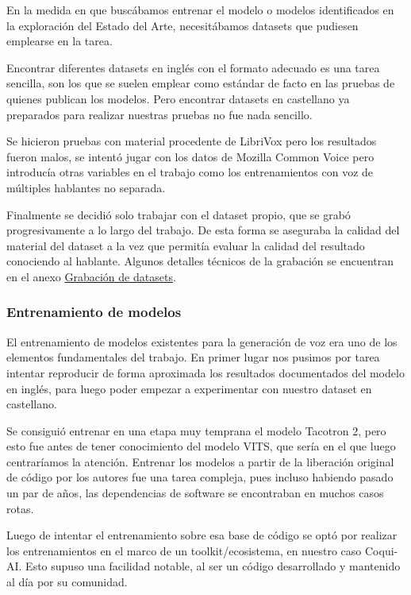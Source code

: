 En la medida en que buscábamos entrenar el modelo o modelos identificados en la exploración del Estado del Arte, necesitábamos datasets que pudiesen emplearse en la tarea.

Encontrar diferentes datasets en inglés con el formato adecuado es una tarea sencilla, son los que se suelen emplear como estándar de facto en las pruebas de quienes publican los modelos. Pero encontrar datasets en castellano ya preparados para realizar nuestras pruebas no fue nada sencillo.

Se hicieron pruebas con material procedente de LibriVox pero los resultados fueron malos, se intentó jugar con los datos de Mozilla Common Voice pero introducía otras variables en el trabajo como los entrenamientos con voz de múltiples hablantes no separada.

Finalmente se decidió solo trabajar con el dataset propio, que se grabó progresivamente a lo largo del trabajo. De esta forma se aseguraba la calidad del material del dataset a la vez que permitía evaluar la calidad del resultado conociendo al hablante. Algunos detalles técnicos de la grabación se encuentran en el anexo \hyperref[Grabación de datasets]{Grabación de datasets}.

\subsubsection{Entrenamiento de modelos}

El entrenamiento de modelos existentes para la generación de voz era uno de los elementos fundamentales del trabajo. En primer lugar nos pusimos por tarea intentar reproducir de forma aproximada los resultados documentados del modelo en inglés, para luego poder empezar a experimentar con nuestro dataset en castellano.

Se consiguió entrenar en una etapa muy temprana el modelo Tacotron 2, pero esto fue antes de tener conocimiento del modelo VITS, que sería en el que luego centraríamos la atención. Entrenar los modelos a partir de la liberación original de código por los autores fue una tarea compleja, pues incluso habiendo pasado un par de años, las dependencias de software se encontraban en muchos casos rotas.

Luego de intentar el entrenamiento sobre esa base de código se optó por realizar los entrenamientos en el marco de un toolkit/ecosistema, en nuestro caso Coqui-AI. Esto supuso una facilidad notable, al ser un código desarrollado y mantenido al día por su comunidad.

